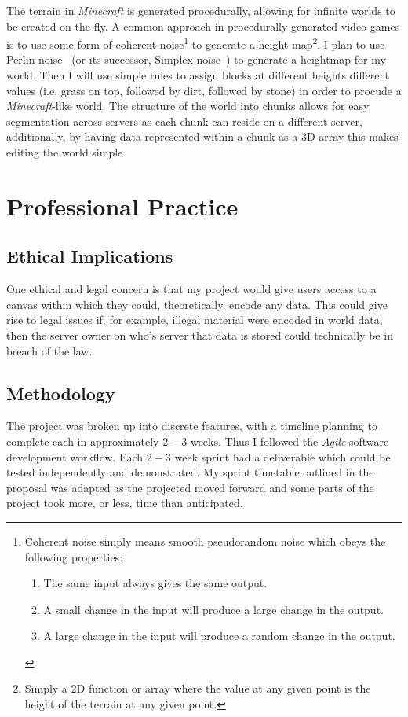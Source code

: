 \documentclass[12pt,notitlepage,a4paper]{report}
\begin{document}
	The terrain in \emph{Minecraft} is generated procedurally, allowing for infinite worlds to be created on the fly. A common approach in procedurally generated video games is to use some form of coherent noise\footnote{Coherent noise simply means smooth pseudorandom noise which obeys the following properties: \begin{enumerate} \item The same input always gives the same output. \item A small change in the input will produce a large change in the output. \item A large change in the input will produce a random change in the output.\end{enumerate}} to generate a height map\footnote{Simply a 2D function or array where the value at any given point is the height of the terrain at any given point.}. I plan to use Perlin noise~\cite{perlin} (or its successor, Simplex noise~\cite{simplex}) to generate a heightmap for my world. Then I will use simple rules to assign blocks at different heights different values (i.e. grass on top, followed by dirt, followed by stone) in order to procude a \emph{Minecraft}-like world. The structure of the world into chunks allows for easy segmentation across servers as each chunk can reside on a different server, additionally, by having data represented within a chunk as a 3D array this makes editing the world simple.
	
	\section{Professional Practice}
	\subsection{Ethical Implications} %
	One ethical and legal concern is that my project would give users access to a canvas within which they could, theoretically, encode any data. This could give rise to legal issues if, for example, illegal material were encoded in world data, then the server owner on who's server that data is stored could technically be in breach of the law.
	
	\subsection{Methodology}
	The project was broken up into discrete features, with a timeline planning to complete each in approximately $2-3$ weeks. Thus I followed the \emph{Agile} software development workflow. Each $2-3$ week sprint had a deliverable which could be tested independently and demonstrated. My sprint timetable outlined in the proposal was adapted as the projected moved forward and some parts of the project took more, or less, time than anticipated.
	
\end{document}

